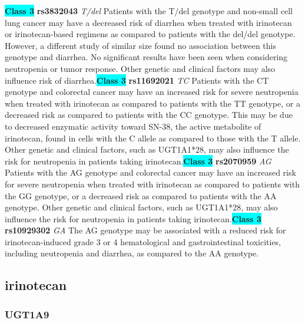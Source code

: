\documentclass{book}
\begin{document}
\begin{center}
\textbf{\colorbox{cyan} {Class 3}} \textbf{ rs3832043 } \textit{ T/del }
Patients with the T/del genotype and non-small cell lung cancer may have a decreased risk of diarrhea when treated with irinotecan or irinotecan-based regimens as compared to patients with the del/del genotype. However, a different study of similar size found no association between this genotype and diarrhea. No significant results have been seen when considering neutropenia or tumor response. Other genetic and clinical factors may also influence risk of diarrhea.\textbf{\colorbox{cyan} {Class 3}} \textbf{ rs11692021 } \textit{ TC }
Patients with the CT genotype and colorectal cancer may have an increased risk for severe neutropenia when treated with irinotecan as compared to patients with the TT genotype, or a decreased risk as compared to patients with the CC genotype. This may be due to decreased enzymatic activity toward SN-38, the active metabolite of irinotecan, found in cells with the C allele as compared to those with the T allele. Other genetic and clinical factors, such as UGT1A1*28, may also influence the risk for neutropenia in patients taking irinotecan.\textbf{\colorbox{cyan} {Class 3}} \textbf{ rs2070959 } \textit{ AG }
Patients with the AG genotype and colorectal cancer may have an increased risk for severe neutropenia when treated with irinotecan as compared to patients with the GG genotype, or a decreased risk as compared to patients with the AA genotype. Other genetic and clinical factors, such as UGT1A1*28, may also influence the risk for neutropenia in patients taking irinotecan.\textbf{\colorbox{cyan} {Class 3}} \textbf{ rs10929302 } \textit{ GA }
The AG genotype may be associated with a reduced risk for irinotecan-induced grade 3 or 4 hematological and gastrointestinal toxicities, including neutropenia and diarrhea, as compared to the AA genotype. 


\end{center}\subsection{ irinotecan }


\subsubsection{ UGT1A9 }
\end{document}
